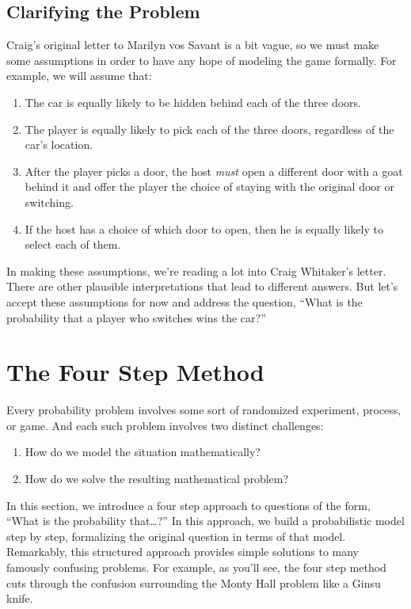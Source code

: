 \subsection{Clarifying the Problem}

Craig's original letter to Marilyn vos Savant is a bit vague, so we
must make some assumptions in order to have any hope of modeling the
game formally.  For example, we will assume that:
\begin{enumerate}

\item The car is equally likely to be hidden behind each of the three
doors.

\item The player is equally likely to pick each of the three doors,
regardless of the car's location.

\item After the player picks a door, the host \emph{must} open a
different door with a goat behind it and offer the player the choice
of staying with the original door or switching.

\item If the host has a choice of which door to open, then he is
equally likely to select each of them.

\end{enumerate}
In making these assumptions, we're reading a lot into Craig
Whitaker's letter.  There are other plausible interpretations that
lead to different answers.  But let's accept these assumptions for now
and address the question, ``What is the probability that a player who
switches wins the car?''

\section{The Four Step Method}\label{4step_sec}

Every probability problem involves some sort of randomized experiment,
process, or game.  And each such problem involves two distinct
challenges:
%
\begin{enumerate}
\item How do we model the situation mathematically?
\item How do we solve the resulting mathematical problem?
\end{enumerate}
%
In this section, we introduce a four step approach to questions of the
form, ``What is the probability that\dots ?''  In this approach, we
build a probabilistic model step by step, formalizing the original
question in terms of that model.  Remarkably, this structured approach
provides simple solutions to many famously confusing problems.  For
example, as you'll see, the four step method cuts through the
confusion surrounding the Monty Hall problem like a Ginsu knife.

